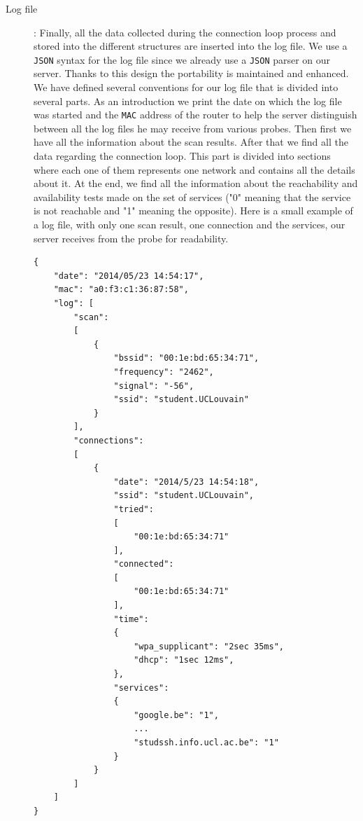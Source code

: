 \begin{description}
	\item[Log file]: Finally, all the data collected during the connection loop process and stored into the different structures are inserted into the log file. We use a \texttt{JSON} syntax for the log file since we already use a \texttt{JSON} parser on our server. Thanks to this design the portability is maintained and enhanced. We have defined several conventions for our log file that is divided into several parts. As an introduction we print the date on which the log file was started and the \texttt{MAC} address of the router to help the server distinguish between all the log files he may receive from various probes. Then first we have all the information about the scan results. After that we find all the data regarding the connection loop. This part is divided into sections where each one of them represents one network and contains all the details about it. At the end, we find all the information about the reachability and availability tests made on the set of services ("0" meaning that the service is not reachable and "1" meaning the opposite). Here is a small example of a log file, with only one scan result, one connection and the services, our server receives from the probe for readability.\\


\begin{lstlisting}[frame=single,breaklines=true,caption={Small log file example}]
{
	"date": "2014/05/23 14:54:17",
	"mac": "a0:f3:c1:36:87:58",
	"log": [
		"scan": 
		[
			{
				"bssid": "00:1e:bd:65:34:71",
				"frequency": "2462",
				"signal": "-56",
				"ssid": "student.UCLouvain"
			}
		],
		"connections": 
		[
			{
				"date": "2014/5/23 14:54:18",
				"ssid": "student.UCLouvain",
				"tried": 
				[ 
					"00:1e:bd:65:34:71"
				],
				"connected": 
				[ 
					"00:1e:bd:65:34:71"
				],
				"time": 
				{
					"wpa_supplicant": "2sec 35ms",
					"dhcp": "1sec 12ms",
				},
				"services":
				{
					"google.be": "1",
					...
					"studssh.info.ucl.ac.be": "1"
				}
			}
		]
	]
}
	\end{lstlisting}
\end{description}


